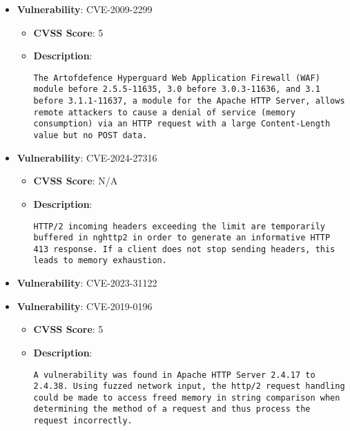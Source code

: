 \documentclass{article}
\begin{document}
\begin{itemize}
        \item \textbf{Vulnerability}: CVE-2009-2299
        \begin{itemize}
            \item \textbf{CVSS Score}:  5 
            \item \textbf{Description}:
            \parbox[t]{0.9\linewidth}{
                \verb|The Artofdefence Hyperguard Web Application Firewall (WAF) module before 2.5.5-11635, 3.0 before 3.0.3-11636, and 3.1 before 3.1.1-11637, a module for the Apache HTTP Server, allows remote attackers to cause a denial of service (memory consumption) via an HTTP request with a large Content-Length value but no POST data.|
            }
        \end{itemize}
    
        \item \textbf{Vulnerability}: CVE-2024-27316
        \begin{itemize}
            \item \textbf{CVSS Score}:  N/A 
            \item \textbf{Description}:
            \parbox[t]{0.9\linewidth}{
                \verb|HTTP/2 incoming headers exceeding the limit are temporarily buffered in nghttp2 in order to generate an informative HTTP 413 response. If a client does not stop sending headers, this leads to memory exhaustion.|
            }
        \end{itemize}
    
        \item \textbf{Vulnerability}: CVE-2023-31122
    
        \item \textbf{Vulnerability}: CVE-2019-0196
        \begin{itemize}
            \item \textbf{CVSS Score}:  5 
            \item \textbf{Description}:
            \parbox[t]{0.9\linewidth}{
                \verb|A vulnerability was found in Apache HTTP Server 2.4.17 to 2.4.38. Using fuzzed network input, the http/2 request handling could be made to access freed memory in string comparison when determining the method of a request and thus process the request incorrectly.|
            }
        \end{itemize}
    

\end{itemize}
\end{document}
